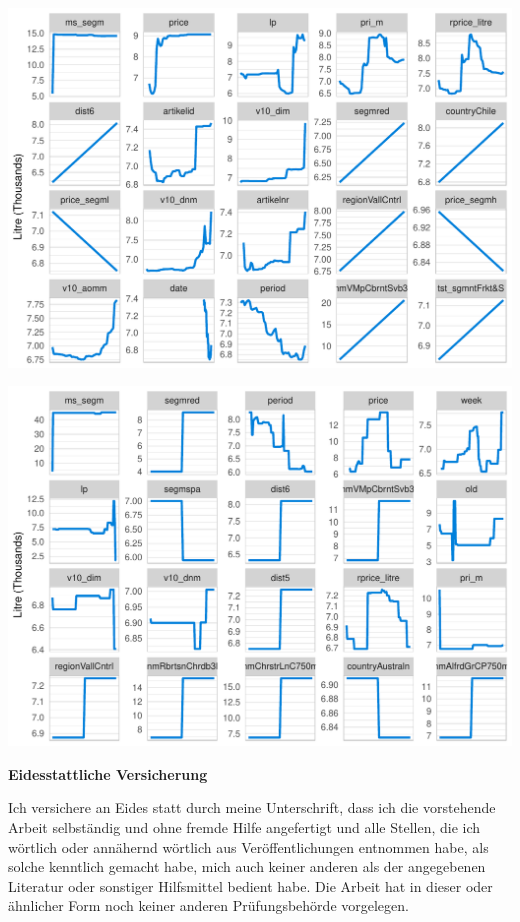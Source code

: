 \documentclass[11pt,]{article}
\let\origfigure\figure
\let\endorigfigure\endfigure
\renewenvironment{figure}[1][2] {
    \expandafter\origfigure\expandafter[H]
} {
    \endorigfigure
}
\begin{document}
\begin{figure}
\centering
\includegraphics{../00_data/output_paper/11_par_dep_random_forest_other.pdf}
\caption{\label{fig:rfpardep_other}Random Forest: Partial Dependence
Plots.}
\end{figure}

\begin{figure}
\centering
\includegraphics{../00_data/output_paper/16_pdp_boosting_main.pdf}
\caption{\label{fig:bgpardep_main}Boosting: Partial Dependence Plots.}
\end{figure}

\cleardoublepage

\newpage
\textbf{Eidesstattliche Versicherung}

\bigskip

Ich versichere an Eides statt durch meine Unterschrift, dass ich die vorstehende Arbeit selbständig und ohne fremde Hilfe angefertigt und alle Stellen, die ich wörtlich oder annähernd wörtlich aus Veröffentlichungen entnommen habe, als solche kenntlich gemacht habe, mich auch keiner anderen als der angegebenen Literatur oder sonstiger Hilfsmittel bedient habe. Die Arbeit hat in dieser oder ähnlicher Form noch keiner anderen Prüfungsbehörde vorgelegen.

\vspace{1cm}
\rule{0pt}{2\baselineskip} %
\par\noindent{} \hfill\makebox[2.25in]{\hrulefill}%
\par\noindent\makebox[2.25in][l]{} \hfill{}%
\end{document}
